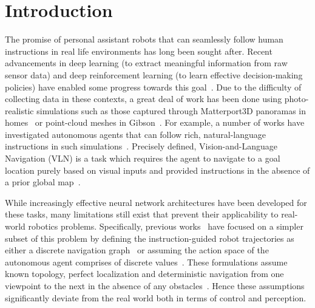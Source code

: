 \documentclass[letter, 10pt, conference]{ieeeconf}
\begin{document}
\section{Introduction}

The promise of personal assistant robots that can seamlessly follow human instructions in real life environments has long been sought after. Recent advancements in deep learning (to extract meaningful information from raw sensor data) and deep reinforcement learning (to learn effective decision-making policies) have enabled some progress towards this goal~\cite{vasudevan2020talk2nav, majumdar2020improving, hao2020towards}. Due to the difficulty of collecting data in these contexts, a great deal of work has been done using photo-realistic simulations such as those captured through Matterport3D panoramas in homes~\cite{Matterport3D} or point-cloud meshes in Gibson~\cite{gibsonenv}. For example, a number of works have investigated autonomous agents that can follow rich, natural-language instructions in such simulations~\cite{ma2019theregretful, Wang2019ReinforcedCM, DBLP:conf/nips/FriedHCRAMBSKD18}. Precisely defined, Vision-and-Language Navigation (VLN) is a task which requires the agent to navigate to a goal location purely based on visual inputs and provided instructions in the absence of a prior global map~\cite{mattersim}.

While increasingly effective neural network architectures have been developed for these tasks, many limitations still exist that prevent their applicability to real-world robotics problems. Specifically, previous works~\cite{Wang2019ReinforcedCM, DBLP:conf/nips/FriedHCRAMBSKD18,46942, Matterport3D, Zhuetal} have focused on a simpler subset of this problem by defining the instruction-guided robot trajectories as either a discrete navigation graph~\cite{Matterport3D, mattersim} or assuming the action space of the autonomous agent comprises of discrete values~\cite{ALFRED20, krantz2020navgraph}. These formulations assume known topology, perfect localization and deterministic navigation from one viewpoint to the next in the absence of any obstacles~\cite{krantz2020navgraph}. Hence these assumptions significantly deviate from the real world both in terms of control and perception.
 
\end{document}

